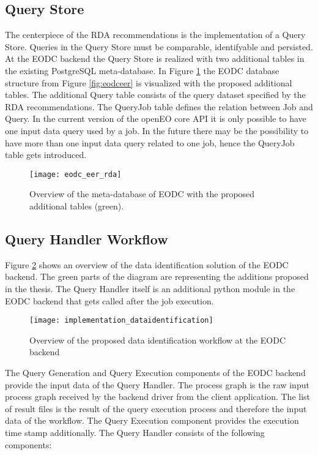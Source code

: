 \documentclass[draft,final]{vutinfth} %
\begin{document}
\subsection{Query Store}
The centerpiece of the RDA recommendations is the implementation of a Query Store. Queries in the Query Store must be comparable, identifyable and persisted. At the EODC backend the Query Store is realized with two additional tables in the existing PostgreSQL meta-database. In Figure \ref{fig:eer_rda} the EODC database structure from Figure \ref{fig:eodceer} is visualized with the proposed additional tables. The additional Query table consists of the query dataset specified by the RDA recommendations. The QueryJob table defines the relation between Job and Query. In the current version of the openEO core API it is only possible to have one input data query used by a job. In the future there may be the possibility to have more than one input data query related to one job, hence the QueryJob table gets introduced. 

\begin{figure}[h]
	\centering
	\texttt{[image: eodc\_eer\_rda]}
	\caption{Overview of the meta-database of EODC with the proposed additional tables (green).}
	\label{fig:eer_rda} %
\end{figure}

\subsection{Query Handler Workflow}
Figure \ref{fig:impldataid} shows an overview of the data identification solution of the EODC backend. The green parts of the diagram are representing the additions proposed in the thesis. The Query Handler itself is an additional python module in the EODC backend that gets called after the job execution. 

\begin{figure}[h]
	\centering
	\texttt{[image: implementation\_dataidentification]}
	\caption{Overview of the proposed data identification workflow at the EODC backend}
	\label{fig:impldataid} %
\end{figure}


The Query Generation and Query Execution components of the EODC backend provide the input data of the Query Handler. The process graph is the raw input process graph received by the backend driver from the client application. The list of result files is the result of the query execution process and therefore the input data of the workflow. The Query Execution component provides the execution time stamp additionally. The Query Handler consists of the following components:
\end{document}
